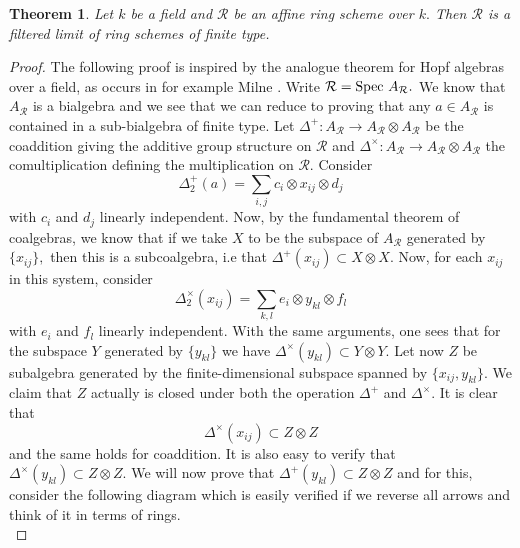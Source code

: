 \documentclass[a4paper, 12pt]{amsart}
\numberwithin{equation}{section}
\newtheorem{theorem}{Theorem}[section]
\theoremstyle{definition}
\begin{document}
\begin{theorem} \label{ringfiltered}
Let $k$ be a field and $\mathcal{R}$ be an affine ring scheme over $k.$ Then $\mathcal{R}$
is a filtered limit of ring schemes of finite type.
\end{theorem}
\begin{proof}
The following proof is inspired by the analogue theorem for Hopf algebras over a field, as occurs in for example Milne \cite[Prop. 11.32]{MilneiAG}. Write $\mathcal{R} = \text{Spec } A_\mathcal{R}.$ We know that $A_\mathcal{R}$ is a bialgebra and we see that
we can reduce to proving that any $a \in A_\mathcal{R}$ is contained in a
sub-bialgebra of finite type. Let $\Delta^+:A_\mathcal{R} \rightarrow A_\mathcal{R} \otimes
A_\mathcal{R}$ be the coaddition giving the additive group structure on $\mathcal{R}$ and
$\Delta^\times: A_\mathcal{R} \rightarrow A_\mathcal{R} \otimes A_\mathcal{R}$ the comultiplication
defining the multiplication on $\mathcal{R}.$ Consider $$ \Delta^+_2(a)= \sum_{i,j}
c_i \otimes x_{ij} \otimes d_j $$ with $c_i$ and $d_j$ linearly
independent. Now, by the fundamental theorem of coalgebras, we know that
if we take $X$ to be the subspace of $A_\mathcal{R}$ generated by $\{x_{ij}\},$
then this is a subcoalgebra, i.e that $\Delta^+(x_{ij}) \subset X
\otimes X.$ Now, for each $x_{ij}$ in this system, consider
$$\Delta^{\times}_2(x_{ij}) = \sum_{k,l} e_i \otimes y_{kl} \otimes f_l$$
with $e_i$ and $f_l$ linearly independent. With the same arguments, one
sees that for the subspace $Y$ generated by $\{y_{kl}\}$ we have
$\Delta^{\times}(y_{kl}) \subset Y \otimes Y.$ Let now $Z$ be subalgebra generated by the finite-dimensional subspace spanned by
 $\{x_{ij}, y_{kl}\}.$ We claim 
that $Z$ actually is closed under both the operation $\Delta^+$ and
$\Delta^{\times}.$ It is clear that $$\Delta^{\times}(x_{ij}) \subset Z
\otimes Z$$ and the same holds for coaddition. It is also easy to verify that $\Delta^\times(y_{kl}) \subset Z \otimes Z.$ We will now prove that
$\Delta^{+}(y_{kl}) \subset Z \otimes Z$ and for this, consider the
following diagram which is easily verified if we reverse all arrows and think of it in terms of rings.  \\
\end{proof}
\end{document}
